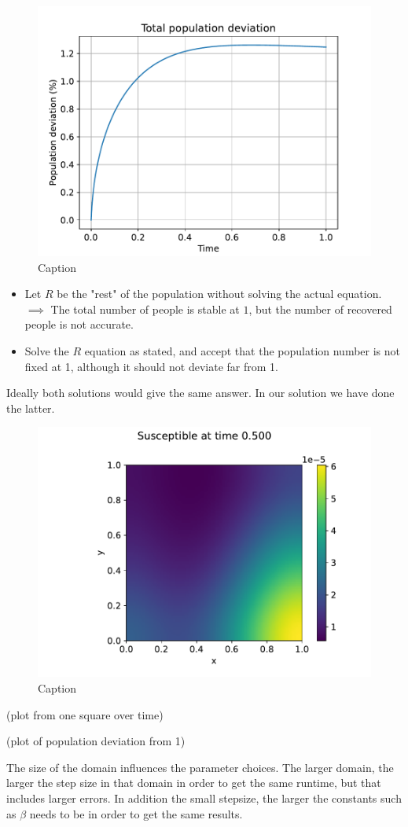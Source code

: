 \begin{figure}[H]
    \centering
    \includegraphics[width=0.5\linewidth]{report/Images/plots/pop_deviation.pdf}
    \caption{Caption}
    \label{fig:non-constant-population-size}
\end{figure}
\begin{itemize}
    \item Let $R$ be the "rest" of the population without solving the actual equation. $\implies$ The total number of people is stable at $1$, but the number of recovered people is not accurate.
    \item Solve the $R$ equation as stated, and accept that the population number is not fixed at 1, although it should not deviate far from 1.
\end{itemize}
Ideally both solutions would give the same answer.
In our solution we have done the latter.

\begin{figure}
    \centering
    \includegraphics[width=\textwidth]{report/Images/plots/plot-i_t=5000-0.pdf}
    \caption{Caption}
    \label{fig:enter-label}
\end{figure}

(plot from one square over time)

(plot of population deviation from 1)

The size of the domain influences the parameter choices. The larger domain, the larger the step size in that domain in order to get the same runtime, but that includes larger errors.
In addition the small stepsize, the larger the constants such as $\beta$ needs to be in order to get the same results.



